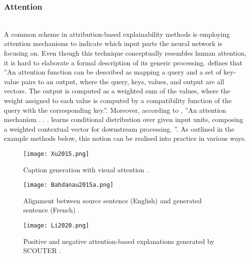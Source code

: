 \documentclass[journal]{IEEEtran}
\begin{document}
\subsubsection{Attention}
\hfill\\
A common scheme in attribution-based explainability methods is employing attention mechanisms to indicate which input parts the neural network is focusing on. Even though this technique conceptually resembles human attention, it is hard to elaborate a formal description of its generic processing. \cite{Vaswani2017} defines that ''An attention function can be described as mapping a query and a set of key-value pairs to an output, where the query, keys, values, and output are all vectors. The output is computed as a weighted sum of the values, where the weight assigned to each value is computed by a compatibility function of the query with the corresponding key.''. Moreover, according to \cite{Xie2020}, ''An attention mechanism . . . learns conditional distribution over given input units, composing a weighted contextual vector for downstream processing. ''. As outlined in the example methods below, this notion can be realised into practice in various ways.

\begin{figure}[h!]
  \texttt{[image: Xu2015.png]}
  \caption{Caption generation with visual attention \cite{Xu2015}.}
\end{figure}

\begin{figure}[h!]
  \texttt{[image: Bahdanau2015a.png]}
  \caption{Alignment between source sentence (English) and generated sentence (French) \cite{Bahdanau2015a}.}
\end{figure}

\begin{figure}[h!]
  \texttt{[image: Li2020.png]}
  \caption{Positive and negative attention-based explanations generated by SCOUTER \cite{Li2020}.}
\end{figure}
\end{document}
